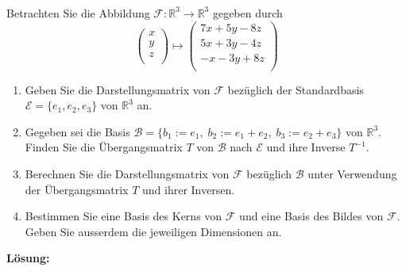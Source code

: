 \subsubsection{} %
Betrachten Sie die Abbildung $\mathcal{F}: \mathbb{R}^3 \rightarrow \mathbb{R}^3$ gegeben durch
\[
\begin{pmatrix}
x\\
y\\
z\\
\end{pmatrix} \mapsto
\begin{pmatrix}
7x+5y-8z\\
5x+3y-4z\\
-x-3y+8z\\
\end{pmatrix}
\]
\begin{enumerate}[label=\alph*)]
    \item Geben Sie die Darstellungsmatrix von $\mathcal{F}$ bezüglich der Standardbasis $\mathcal{E} = \{e_1,e_2,e_3\}$ von $\mathbb{R}^3$ an.
    \item Gegeben sei die Basis $\mathcal{B} = \{b_1 := e_1,\; b_2 :=e_1+e_2,\; b_3 := e_2+e_3 \}$ von $\mathbb{R}^3$. Finden Sie die Übergangsmatrix $T$ von $\mathcal{B}$ nach $\mathcal{E}$ und ihre Inverse $T^{-1}$.
    \item Berechnen Sie die Darstellungsmatrix von $\mathcal{F}$ bezüglich $\mathcal{B}$ unter Verwendung der Übergangsmatrix $T$ und ihrer Inversen.
    \item Bestimmen Sie eine Basis des Kerns von $\mathcal{F}$ und eine Basis des Bildes von $\mathcal{F}$. Geben Sie ausserdem die jeweiligen Dimensionen an.
\end{enumerate}

\noindent \textbf{Lösung:}